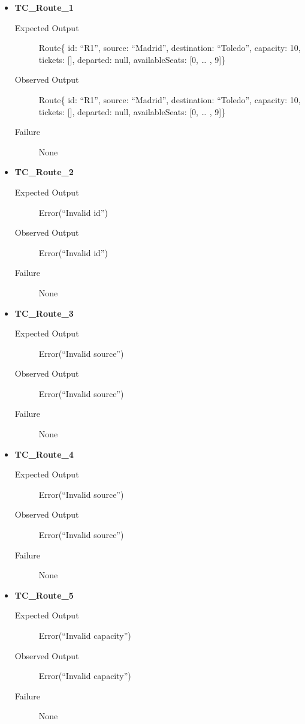 \documentclass[11pt]{article}
\begin{document}
\begin{itemize}
\item \textbf{TC\_Route\_1}
\begin{description}
\item[{Expected Output}] Route\{ id: “R1”, source: “Madrid”, destination: “Toledo”, capacity: 10,  tickets: [], departed: null, availableSeats: [0, … , 9]\}
\item[{Observed Output}] Route\{ id: “R1”, source: “Madrid”, destination: “Toledo”, capacity: 10,  tickets: [], departed: null, availableSeats: [0, … , 9]\}
\item[{Failure}] None
\end{description}

\item \textbf{TC\_Route\_2}
\begin{description}
\item[{Expected Output}] Error(“Invalid id”)
\item[{Observed Output}] Error(“Invalid id”)
\item[{Failure}] None
\end{description}

\item \textbf{TC\_Route\_3}
\begin{description}
\item[{Expected Output}] Error(“Invalid source”)
\item[{Observed Output}] Error(“Invalid source”)
\item[{Failure}] None
\end{description}

\item \textbf{TC\_Route\_4}
\begin{description}
\item[{Expected Output}] Error(“Invalid source”)
\item[{Observed Output}] Error(“Invalid source”)
\item[{Failure}] None
\end{description}

\item \textbf{TC\_Route\_5}
\begin{description}
\item[{Expected Output}] Error(“Invalid capacity”)
\item[{Observed Output}] Error(“Invalid capacity”)
\item[{Failure}] None
\end{description}


\end{itemize}
\end{document}
